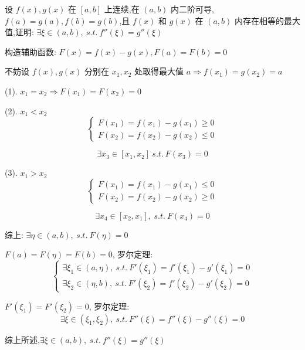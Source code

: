 \begin{proposition}
	设 $f(x),g(x)$ 在 $[a,b]$ 上连续,在 $(a,b)$ 内二阶可导,$f(a)=g(a),f(b)=g(b)$,且 $f(x)$ 和 $g(x)$ 在 $(a,b)$ 内存在相等的最大值,证明: $\exists \xi\in(a,b),\ s.t.\ f''(\xi)=g''(\xi)$
\end{proposition}
\begin{solution}

	构造辅助函数: $F(x)=f(x)-g(x), F(a) = F(b) = 0$
	
	不妨设 $f(x),g(x)$ 分别在 $x_{1},x_{2}$ 处取得最大值 $a\Rightarrow f(x_{1})=g(x_{2})=a$

	(1). $x_{1}=x_{2}\Rightarrow F(x_{1})=F(x_{2})=0$

	(2). $x_{1}<x_{2}$
	$$\begin{cases}
		F(x_{1}) = f(x_{1})-g(x_{1})\geq 0\\
		F(x_{2}) = f(x_{2})-g(x_{2})\leq 0
	\end{cases}$$

	$$\exists x_{3}\in [x_{1},x_{2}] \ s.t.\ F(x_{3})=0$$

	(3). $x_{1}>x_{2}$
	$$\begin{cases}
		F(x_{1}) = f(x_{1})-g(x_{1})\leq 0\\
		F(x_{2}) = f(x_{2})-g(x_{2})\geq 0
	\end{cases}$$

	$$\exists x_{4}\in [x_{2},x_{1}],\ s.t.\ F(x_{4})=0$$

	综上: $\exists \eta\in(a,b),\ s.t.\ F(\eta)=0$

	$F(a) = F(\eta) = F(b) = 0$, 罗尔定理:
	$$\begin{cases}
		\exists \xi_{1}\in(a,\eta),\ s.t.\ F'(\xi_{1})=f'(\xi_{1})-g'(\xi_{1})=0 \\
		\exists \xi_{2}\in(\eta,b),\ s.t.\ F'(\xi_{2})=f'(\xi_{2})-g'(\xi_{2})=0
	\end{cases}$$

	$F'(\xi_{1})= F'(\xi_{2}) = 0$, 罗尔定理:
	$$\exists \xi\in(\xi_{1},\xi_{2}),\ s.t.\ F''(\xi)=f''(\xi)-g''(\xi)=0$$

	综上所述,$\exists \xi\in(a,b),\ s.t.\ f''(\xi)=g''(\xi)$
\end{solution}

